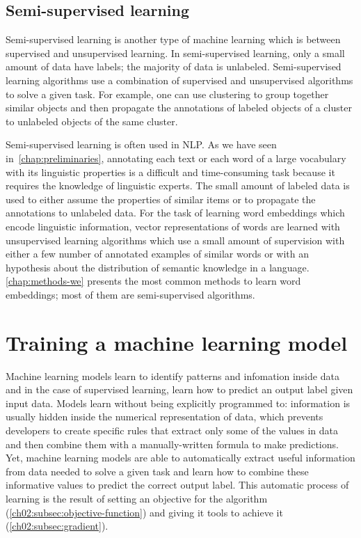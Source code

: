   \subsection{Semi-supervised learning}
    \label{ch02:subsec:semi-supervised-learning}
    Semi-supervised learning is another type of machine learning which is
    between supervised and unsupervised learning. In semi-supervised learning,
    only a small amount of data have labels; the majority of data is unlabeled.
    Semi-supervised learning algorithms use a combination of supervised and
    unsupervised algorithms to solve a given task. For example, one can use
    clustering to group together similar objects and then propagate the
    annotations of labeled objects of a cluster to unlabeled objects of the same
    cluster. \medskip

    Semi-supervised learning is often used in NLP. As we have seen
    in~\autoref{chap:preliminaries}, annotating each text or each word of a
    large vocabulary with its linguistic properties is a difficult and
    time-consuming task because it requires the knowledge of linguistic experts.
    The small amount of labeled data is used to either assume the properties of
    similar items or to propagate the annotations to unlabeled data. For the
    task of learning word embeddings which encode linguistic information, vector
    representations of words are learned with unsupervised learning algorithms
    which use a small amount of supervision with either a few number of
    annotated examples of similar words or with an hypothesis about the
    distribution of semantic knowledge in a language. \autoref{chap:methods-we}
    presents the most common methods to learn word embeddings; most of them are
    semi-supervised algorithms.

\section{Training a machine learning model}
  \label{ch02:sec:training-model}
  Machine learning models learn to identify patterns and infomation inside data
  and in the case of supervised learning, learn how to predict an output label
  given input data.  Models learn without being explicitly programmed to:
  information is usually hidden inside the numerical representation of data,
  which prevents developers to create specific rules that extract only some of
  the values in data and then combine them with a manually-written formula to
  make predictions.  Yet, machine learning models are able to automatically
  extract useful information from data needed to solve a given task and learn
  how to combine these informative values to predict the correct output label.
  This automatic process of learning is the result of setting an objective for
  the algorithm (\autoref{ch02:subsec:objective-function}) and giving it tools
  to achieve it (\autoref{ch02:subsec:gradient}).


